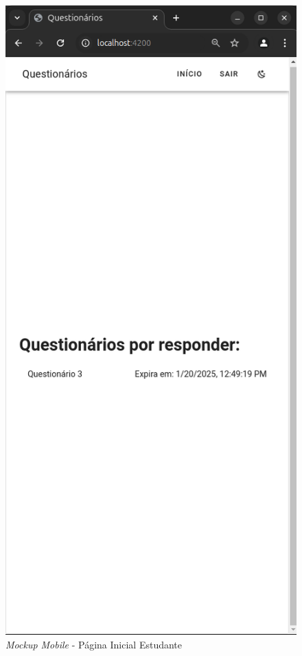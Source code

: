 \documentclass[12pt,a4paper,final]{article}
\begin{document}
    \begin{figure}[H]
        \centering
        \includegraphics[width=\textwidth,height=0.9\textheight,keepaspectratio]{mockups/questionarios.wireframes-estudante-geral-mobile}
        \caption{\textit{Mockup Mobile} - Página Inicial Estudante}
        \label{fig:mm-pie}
    \end{figure}
\end{document}
